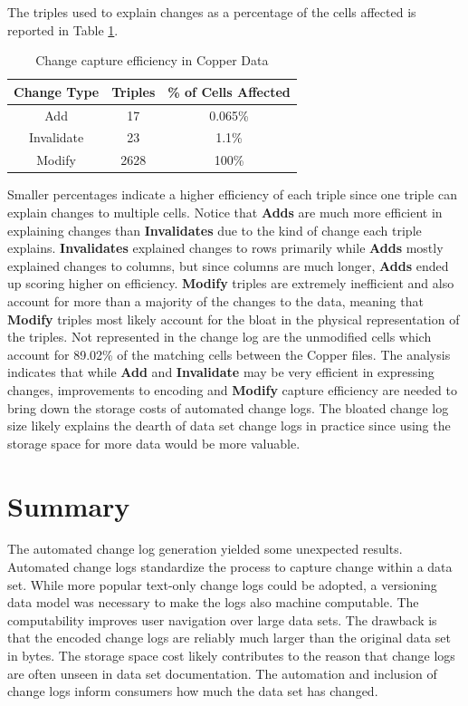 The triples used to explain changes as a percentage of the cells affected is reported in Table \ref{table:Cu_change}.
\begin{table}
	\caption{Change capture efficiency in Copper Data}
	\label{table:Cu_change}
	\centering
	\begin{tabular}{|c|c|c|}
		\hline
		Change Type&	Triples&	\% of Cells Affected\\ \hline
		Add&	17&	0.065\%\\
		Invalidate&	23&	1.1\%\\
		Modify&	2628&	100\%\\
		\hline
	\end{tabular}
\end{table}
Smaller percentages indicate a higher efficiency of each triple since one triple can explain changes to multiple cells.
Notice that \textbf{Adds} are much more efficient in explaining changes than \textbf{Invalidates} due to the kind of change each triple explains.
\textbf{Invalidates} explained changes to rows primarily while \textbf{Adds} mostly explained changes to columns, but since columns are much longer, \textbf{Adds} ended up scoring higher on efficiency.
\textbf{Modify} triples are extremely inefficient and also account for more than a majority of the changes to the data, meaning that \textbf{Modify} triples most likely account for the bloat in the physical representation of the triples.
Not represented in the change log are the unmodified cells which account for 89.02\% of the matching cells between the Copper files.
The analysis indicates that while \textbf{Add} and \textbf{Invalidate} may be very efficient in expressing changes, improvements to encoding and \textbf{Modify} capture efficiency are needed to bring down the storage costs of automated change logs.
The bloated change log size likely explains the dearth of data set change logs in practice since using the storage space for more data would be more valuable. 

\section{Summary}

The automated change log generation yielded some unexpected results.
Automated change logs standardize the process to capture change within a data set.
While more popular text-only change logs could be adopted, a versioning data model was necessary to make the logs also machine computable.
The computability improves user navigation over large data sets.
The drawback is that the encoded change logs are reliably much larger than the original data set in bytes.
The storage space cost likely contributes to the reason that change logs are often unseen in data set documentation.
The automation and inclusion of change logs inform consumers how much the data set has changed.

